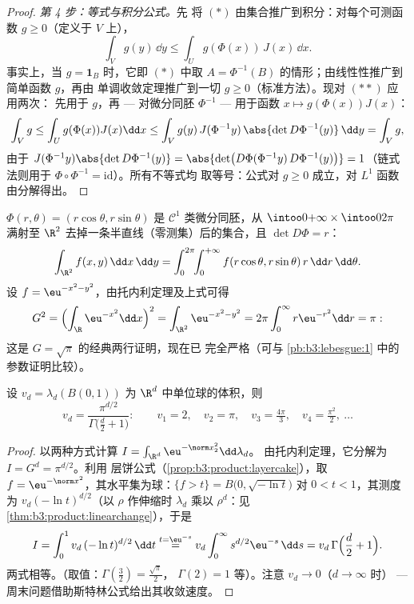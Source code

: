 \begin{proof}
\emph{第 4 步：等式与积分公式。}先
将 $(*)$ 由集合推广到积分：对每个可测函数 $g
\geq 0$（定义于 $V$ 上），
\[
\int_V g(y)\,\dd y \leq \int_U g(\Phi(x))\,J(x)\,\dd x .
\tag{$**$}
\]
事实上，当 $g = \mathbf 1_B$ 时，它即 $(*)$ 中取 $A =
\Phi^{-1}(B)$ 的情形；由线性性推广到简单函数 $g$，再由
单调收敛定理推广到一切 $g \geq 0$（标准方法）。现对 $(**)$ 应用两次：
先用于 $g$，再 --- 对微分同胚 $\Phi^{-1}$ ---
用于函数 $x \mapsto g(\Phi(x))J(x)$：
\[
\int_Vg \leq \int_U g(\Phi(x))J(x)\dd x
\leq \int_V g(y)\,J(\Phi^{-1}y)\,\abs{\det
D\Phi^{-1}(y)}\,\dd y = \int_V g ,
\]
由于 $J(\Phi^{-1}y)\abs{\det D\Phi^{-1}(y)} = \abs{\det\bigl(
D\Phi(\Phi^{-1}y)\,D\Phi^{-1}(y)\bigr)} = 1$（链式法则用于
$\Phi\circ\Phi^{-1} = \mathrm{id}$）。所有不等式均
取等号：公式对 $g \geq 0$ 成立，对 $L^1$
函数由分解得出。
\end{proof}

\begin{example}
\label{ex:b3:product:polar}
$\Phi(r, \theta) = (r\cos\theta, r\sin\theta)$ 是 $\mathcal
C^1$ 类微分同胚，从 $\intoo0{+\infty}\times\intoo0{2\pi}$
满射至 $\R^2$ 去掉一条半直线（零测集）后的集合，且 $\det D\Phi =
r$：
\[
\int_{\R^2}f(x, y)\,\dd x\,\dd y
= \int_0^{2\pi}\!\!\int_0^{+\infty}
f(r\cos\theta, r\sin\theta)\,r\,\dd r\,\dd\theta .
\]
设 $f = \eu^{-x^2-y^2}$，由托内利定理及上式可得
\[
G^2 = \Bigl(\int_\R \eu^{-x^2}\dd x\Bigr)^2
= \int_{\R^2}\eu^{-x^2-y^2}
= 2\pi\int_0^\infty r\eu^{-r^2}\dd r = \pi:
\]
这是 $G = \sqrt\pi$ 的经典两行证明，现在已
完全严格（可与
\cref{pb:b3:lebesgue:1} 中的参数证明比较）。
\end{example}

\begin{theorem}[单位球的体积]
\label{thm:b3:product:ballvolume}
设 $v_d = \lambda_d(B(0,1))$ 为 $\R^d$ 中单位球的体积，则
\[
v_d = \frac{\pi^{d/2}}{\Gamma\bigl(\frac d2 + 1\bigr)} :
\qquad
v_1 = 2,\quad v_2 = \pi,\quad v_3 = \tfrac{4\pi}3,\quad
v_4 = \tfrac{\pi^2}2,\ \dots
\]
\end{theorem}

\begin{proof}
以两种方式计算 $I = \int_{\R^d}\eu^{-\norm x_2^2}\dd\lambda_d$。
由托内利定理，它分解为 $I = G^d = \pi^{d/2}$。利用
层饼公式（\cref{prop:b3:product:layercake}），取 $f = \eu^{-
\norm x^2}$，其水平集为球：$\{f > t\} =
B\bigl(0, \sqrt{-\ln t}\bigr)$ 对 $0 < t < 1$，其测度为
$v_d(-\ln t)^{d/2}$（以 $\rho$ 作伸缩时 $\lambda_d$ 乘以
$\rho^d$：见\cref{thm:b3:product:linearchange}），于是
\[
I = \int_0^1 v_d\,(-\ln t)^{d/2}\,\dd t
\overset{t = \eu^{-s}}{=}
v_d\int_0^\infty s^{d/2}\eu^{-s}\,\dd s
= v_d\,\Gamma\Bigl(\frac d2 + 1\Bigr).
\]
两式相等。（取值：$\Gamma(\frac32) = \frac{\sqrt\pi}2$，
$\Gamma(2) = 1$ 等）。注意 $v_d \to 0$（$d \to \infty$ 时） ---
周末问题借助斯特林公式给出其收敛速度。
\end{proof}

